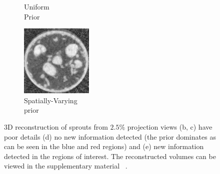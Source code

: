 \documentclass[journal]{IEEEtran}
\begin{document}
\begin{figure}[!h]
\begin{subfigure}[b]{0.3\linewidth}
        \caption{Uniform\\ Prior}
     \end{subfigure}
\quad
    \begin{subfigure}[b]{0.3\linewidth}
        \includegraphics[width=\textwidth]{../images/sprouts/weightedPriorIm.png}
        \caption{Spatially-Varying\\ prior}
    \end{subfigure}
     \caption{3D reconstruction of sprouts from $2.5\%$ projection views
   (b, c) have poor details (d) no new information detected (the
   prior dominates as can be seen in the blue and red regions) and
   (e) new information detected in the regions of interest. The reconstructed volumes can be viewed  in the supplementary material ~\cite{supp_paper}.} 
\label{fig:sprouts_3D_results}
\end{figure}

\end{document}
